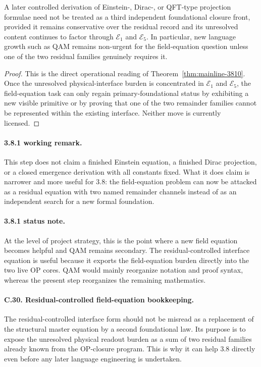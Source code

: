 \begin{corollary}
\label{cor:mainline-3810}
A later controlled derivation of Einstein-, Dirac-, or QFT-type projection formulae need not be treated as a third independent foundational closure front, provided it remains conservative over the residual record and its unresolved content continues to factor through \(\mathcal E_{1}\) and \(\mathcal E_{5}\). In particular, new language growth such as QAM remains non-urgent for the field-equation question unless one of the two residual families genuinely requires it.
\end{corollary}

\begin{proof}
This is the direct operational reading of Theorem~\ref{thm:mainline-3810}. Once the unresolved physical-interface burden is concentrated in \(\mathcal E_{1}\) and \(\mathcal E_{5}\), the field-equation task can only regain primary-foundational status by exhibiting a new visible primitive or by proving that one of the two remainder families cannot be represented within the existing interface. Neither move is currently licensed.
\end{proof}

\paragraph{3.8.1 working remark.}
This step does not claim a finished Einstein equation, a finished Dirac projection, or a closed emergence derivation with all constants fixed. What it does claim is narrower and more useful for 3.8: the field-equation problem can now be attacked as a residual equation with two named remainder channels instead of as an independent search for a new formal foundation.

\paragraph{3.8.1 status note.}
At the level of project strategy, this is the point where a new field equation becomes helpful and QAM remains secondary. The residual-controlled interface equation is useful because it exports the field-equation burden directly into the two live OP cores. QAM would mainly reorganize notation and proof syntax, whereas the present step reorganizes the remaining mathematics.

\paragraph{C.30. Residual-controlled field-equation bookkeeping.}
The residual-controlled interface form should not be misread as a replacement of the structural master equation by a second foundational law. Its purpose is to expose the unresolved physical readout burden as a sum of two residual families already known from the OP-closure program. This is why it can help 3.8 directly even before any later language engineering is undertaken.

